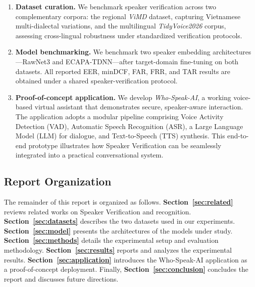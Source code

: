 \begin{enumerate}
    \item \textbf{Dataset curation.} We benchmark speaker verification across two complementary corpora: the regional \emph{ViMD} dataset, capturing Vietnamese multi-dialectal variations, and the multilingual \emph{TidyVoice2026} corpus, assessing cross-lingual robustness under standardized verification protocols.

    \item \textbf{Model benchmarking.} We benchmark two speaker embedding architectures---RawNet3 and ECAPA-TDNN---after target-domain fine-tuning on both datasets. All reported EER, minDCF, FAR, FRR, and TAR results are obtained under a shared speaker-verification protocol.

    \item \textbf{Proof-of-concept application.} We develop \emph{Who-Speak-AI}, a working voice-based virtual assistant that demonstrates secure, speaker-aware interaction. The application adopts a modular pipeline comprising Voice Activity Detection (VAD), Automatic Speech Recognition (ASR), a Large Language Model (LLM) for dialogue, and Text-to-Speech (TTS) synthesis. This end-to-end prototype illustrates how Speaker Verification can be seamlessly integrated into a practical conversational system.
\end{enumerate}

\subsection{Report Organization}
The remainder of this report is organized as follows.
\textbf{Section~\ref{sec:related}} reviews related works on Speaker Verification and recognition.
\textbf{Section~\ref{sec:datasets}} describes the two datasets used in our experiments.
\textbf{Section~\ref{sec:model}} presents the architectures of the models under study.
\textbf{Section~\ref{sec:methods}} details the experimental setup and evaluation methodology.
\textbf{Section~\ref{sec:results}} reports and analyzes the experimental results.
\textbf{Section~\ref{sec:application}} introduces the Who-Speak-AI application as a proof-of-concept deployment.
Finally, \textbf{Section~\ref{sec:conclusion}} concludes the report and discusses future directions.
